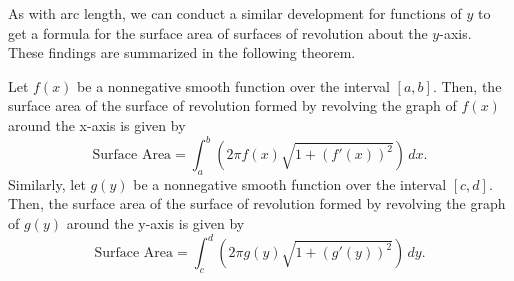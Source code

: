 \documentclass{report}
\begin{document}
        As with arc length, we can conduct a similar development for functions of \(y\) to get a formula for the surface area of surfaces of revolution about the \(y\)-axis. These findings are summarized in the following theorem.
        \bigbreak \noindent 
        \begin{thrm}
           Let \( f(x) \) be a nonnegative smooth function over the interval \([a,b]\).
Then, the surface area of the surface of revolution formed by revolving the graph of \( f(x) \)
around the x-axis is given by
\[
\text{Surface Area} = \int_{a}^{b} \left( 2\pi f(x) \sqrt{1 + \left( f'(x) \right)^2} \right) \, dx.
\]
Similarly, let \( g(y) \) be a nonnegative smooth function over the interval \([c,d]\).
Then, the surface area of the surface of revolution formed by revolving the graph of \( g(y) \)
around the y-axis is given by
\[
\text{Surface Area} = \int_{c}^{d} \left( 2\pi g(y) \sqrt{1 + \left( g'(y) \right)^2} \right) \, dy.
\] 
        \end{thrm}
        








    


    
    

    

  

  
  
  
  






    


    
\end{document}
